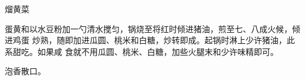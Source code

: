 %
%
%
%
%
%
%
\begin{recipe}{熘黄菜}

\ingredients


\preparation

蛋黄和以水豆粉加一勺清水搅匀，锅烧至将红时倾进猪油，煎至七、八成火候，倾进鸡蛋
炒熟，随即加进瓜圆、桃米和白糖，炒转即成。起锅时淋上少许猪油，此系甜吃。如果咸
食就不用瓜圆、桃米、白糖，加些火腿末和少许味精即可。

\features

泡香散口。

\end{recipe}

